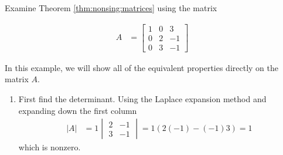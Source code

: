 \begin{example}
Examine Theorem \ref{thm:nonsing:matrices} using the matrix 

\begin{align*}
A &= \begin{bmatrix}
1 & 0 & 3 \\
0 & 2 & -1 \\
0 & 3 & -1
\end{bmatrix}
\end{align*}

\solution

In this example, we will show all of the equivalent properties directly on the matrix $A$.

\begin{enumerate}
\item First find the determinant.  Using the Laplace expansion method and expanding down the first column
%
\begin{align*}
|A| & = 1 \begin{vmatrix}
2 & -1 \\ 3 & -1 
\end{vmatrix} = 1 (2(-1)-(-1)3) = 1
\end{align*}
which is nonzero. 


\end{enumerate}
\end{example}
